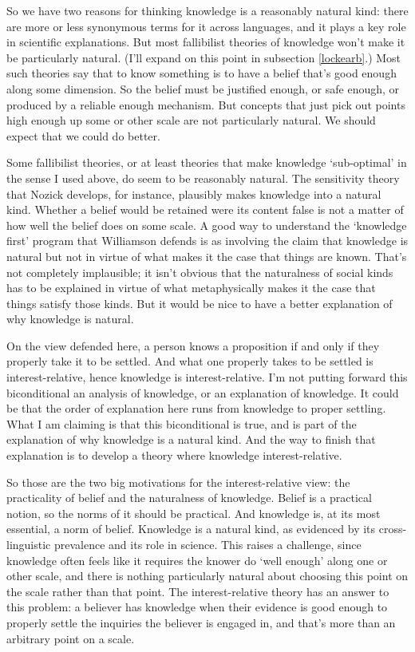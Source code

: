 \documentclass[
  11pt,
]{book}
\begin{document}
So we have two reasons for thinking knowledge is a reasonably natural kind: there are more or less synonymous terms for it across languages, and it plays a key role in scientific explanations. But most fallibilist theories of knowledge won't make it be particularly natural. (I'll expand on this point in subsection \ref{lockearb}.) Most such theories say that to know something is to have a belief that's good enough along some dimension. So the belief must be justified enough, or safe enough, or produced by a reliable enough mechanism. But concepts that just pick out points high enough up some or other scale are not particularly natural. We should expect that we could do better.

Some fallibilist theories, or at least theories that make knowledge `sub-optimal' in the sense I used above, do seem to be reasonably natural. The sensitivity theory that Nozick \citeyearpar{Nozick1981} develops, for instance, plausibly makes knowledge into a natural kind. Whether a belief would be retained were its content false is not a matter of how well the belief does on some scale. A good way to understand the `knowledge first' program that Williamson \citeyearpar{Williamson2000} defends is as involving the claim that knowledge is natural but not in virtue of what makes it the case that things are known. That's not completely implausible; it isn't obvious that the naturalness of social kinds has to be explained in virtue of what metaphysically makes it the case that things satisfy those kinds. But it would be nice to have a better explanation of why knowledge is natural.

On the view defended here, a person knows a proposition if and only if they properly take it to be settled. And what one properly takes to be settled is interest-relative, hence knowledge is interest-relative. I'm not putting forward this biconditional an analysis of knowledge, or an explanation of knowledge. It could be that the order of explanation here runs from knowledge to proper settling. What I am claiming is that this biconditional is true, and is part of the explanation of why knowledge is a natural kind. And the way to finish that explanation is to develop a theory where knowledge interest-relative.

So those are the two big motivations for the interest-relative view: the practicality of belief and the naturalness of knowledge. Belief is a practical notion, so the norms of it should be practical. And knowledge is, at its most essential, a norm of belief. Knowledge is a natural kind, as evidenced by its cross-linguistic prevalence and its role in science. This raises a challenge, since knowledge often feels like it requires the knower do `well enough' along one or other scale, and there is nothing particularly natural about choosing this point on the scale rather than that point. The interest-relative theory has an answer to this problem: a believer has knowledge when their evidence is good enough to properly settle the inquiries the believer is engaged in, and that's more than an arbitrary point on a scale.
\end{document}
